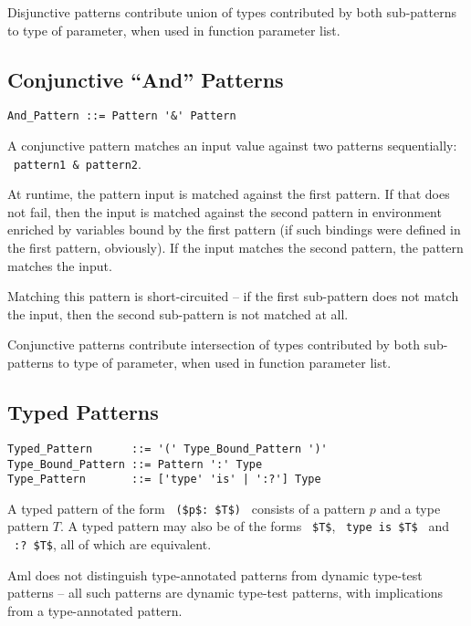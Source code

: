 Disjunctive patterns contribute union of types contributed by both sub-patterns to type of parameter, when used in function parameter list. 





\subsection{Conjunctive ``And'' Patterns}
\label{sec:conjunctive-patterns}

\grammar\begin{lstlisting}
And_Pattern ::= Pattern '&' Pattern
\end{lstlisting}

A conjunctive pattern matches an input value against two patterns sequentially: ~\lstinline!pattern1 & pattern2!. 

At runtime, the pattern input is matched against the first pattern. If that does not fail, then the input is matched against the second pattern in environment enriched by variables bound by the first pattern (if such bindings were defined in the first pattern, obviously). If the input matches the second pattern, the pattern matches the input. 

Matching this pattern is short-circuited -- if the first sub-pattern does not match the input, then the second sub-pattern is not matched at all. 

Conjunctive patterns contribute intersection of types contributed by both sub-patterns to type of parameter, when used in function parameter list. 





\subsection{Typed Patterns}
\label{sec:typed-patterns}

\grammar\begin{lstlisting}
Typed_Pattern      ::= '(' Type_Bound_Pattern ')'
Type_Bound_Pattern ::= Pattern ':' Type
Type_Pattern       ::= ['type' 'is' | ':?'] Type
\end{lstlisting}

A typed pattern of the form ~\lstinline!($p$: $T$)!~ consists of a pattern $p$ and a type pattern $T$. A typed pattern may also be of the forms ~\lstinline!$T$!, ~\lstinline!type is $T$!~ and
~\lstinline!:? $T$!, all of which are equivalent. 

Aml does not distinguish type-annotated patterns from dynamic type-test patterns -- all such patterns are dynamic type-test patterns, with implications from a type-annotated pattern. 

